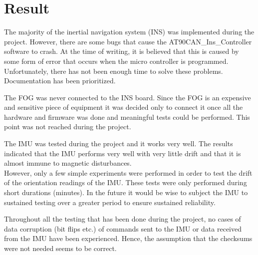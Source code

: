 
\section{Result}\label{sec:result}
The majority of the inertial navigation system (INS) was implemented during the project. However, there are some bugs that cause the AT90CAN\_Ins\_Controller software to crash. At the time of writing, it is believed that this is caused by some form of error that occurs when the micro controller is programmed. Unfortunately, there has not been enough time to solve these problems. Documentation has been prioritized.

The FOG was never connected to the INS board. Since the FOG is an expensive and sensitive piece of equipment it was decided only to connect it once all the hardware and firmware was done and meaningful tests could be performed. This point was not reached during the project.

The IMU was tested during the project and it works very well. The results indicated that the IMU performs very well with very little drift and that it is almost immune to magnetic disturbances. \\
However, only a few simple experiments were performed in order to test the drift of the orientation readings of the IMU. These tests were only performed during short durations (minutes). In the future it would be wise to subject the IMU to sustained testing over a greater period to ensure sustained reliability. 

Throughout all the testing that has been done during the project, no cases of data corruption (bit flips etc.) of commands sent to the IMU or data received from the IMU have been experienced. Hence, the assumption that the checksums were not needed seems to be correct.
